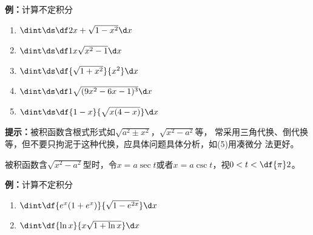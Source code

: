 {\bf 例：}计算不定积分
\begin{enumerate}[(1)]
  \setlength{\itemindent}{1cm}
  \item $\dint\ds\df2{x+\sqrt{1-x^2}}\d x$
  \item $\dint\ds\df1{x\sqrt{x^2-1}}\d x$
  \item $\dint\ds\df{\sqrt{1+x^2}}{x^2}\d x$
  \item $\dint\ds\df1{\sqrt{(9x^2-6x-1)^3}}\d x$
  \item $\dint\ds\df{1-x}{\sqrt{x(4-x)}}\d x$
\end{enumerate}
% 
% 
% 
% 
% 
% 
% 
% 

\begin{shaded}
{\bf 提示：}被积函数含根式形式如$\sqrt{a^2\pm x^2}$，$\sqrt{x^2-a^2}$等，
常采用三角代换、倒代换等，但不要只拘泥于这种代换，应具体问题具体分析，如(5)用凑微分
法更好。

被积函数含$\sqrt{x^2-a^2}$型时，令$x=a\sec t$或者$x=a\csc t$，视$0<t<\df{\pi}2$。
\end{shaded}

{\bf 例：}计算不定积分
\begin{enumerate}[(1)]
  \setlength{\itemindent}{1cm}
  \item $\dint\df{e^x(1+e^x)}{\sqrt{1-e^{2x}}}\d x$
  \item $\dint\df{\ln x}{x\sqrt{1+\ln x}}\d x$
\end{enumerate}

% 
% 
% 
% 
% 

